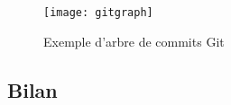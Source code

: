 \begin{figure}[htb]
	\centering
	\texttt{[image: gitgraph]}
	\caption{Exemple d'arbre de commits Git}
	\label{fig:git}
\end{figure}
\subsection{Bilan}